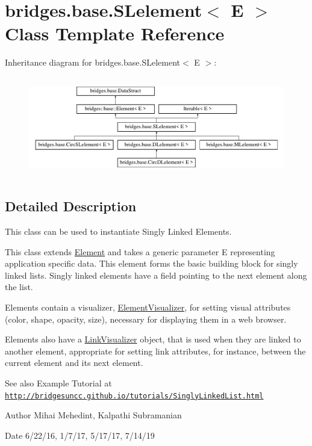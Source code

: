\hypertarget{classbridges_1_1base_1_1_s_lelement}{}\section{bridges.\+base.\+S\+Lelement$<$ E $>$ Class Template Reference}
\label{classbridges_1_1base_1_1_s_lelement}
Inheritance diagram for bridges.\+base.\+S\+Lelement$<$ E $>$\+:\begin{figure}[H]
\begin{center}
\leavevmode
\includegraphics[height=4.402516cm]{classbridges_1_1base_1_1_s_lelement}
\end{center}
\end{figure}


\subsection{Detailed Description}
This class can be used to instantiate Singly Linked Elements. 

This class extends \hyperlink{classbridges_1_1base_1_1_element}{Element} and takes a generic parameter E representing application specific data. This element forms the basic building block for singly linked lists. Singly linked elements have a field pointing to the next element along the list.

Elements contain a visualizer, \hyperlink{classbridges_1_1base_1_1_element_visualizer}{Element\+Visualizer}, for setting visual attributes (color, shape, opacity, size), necessary for displaying them in a web browser.

Elements also have a \hyperlink{classbridges_1_1base_1_1_link_visualizer}{Link\+Visualizer} object, that is used when they are linked to another element, appropriate for setting link attributes, for instance, between the current element and its next element.

\begin{DoxySeeAlso}{See also}
Example Tutorial at \href{http://bridgesuncc.github.io/tutorials/SinglyLinkedList.html}{\tt http\+://bridgesuncc.\+github.\+io/tutorials/\+Singly\+Linked\+List.\+html}
\end{DoxySeeAlso}
\begin{DoxyAuthor}{Author}
Mihai Mehedint, Kalpathi Subramanian
\end{DoxyAuthor}
\begin{DoxyDate}{Date}
6/22/16, 1/7/17, 5/17/17, 7/14/19
\end{DoxyDate}

